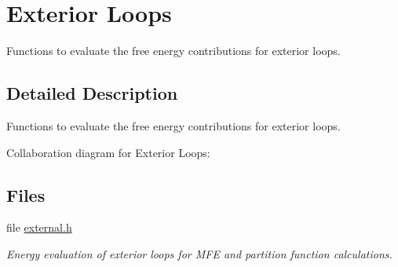 \hypertarget{group__eval__loops__ext}{}\section{Exterior Loops}
\label{group__eval__loops__ext}


Functions to evaluate the free energy contributions for exterior loops.  




\subsection{Detailed Description}
Functions to evaluate the free energy contributions for exterior loops. 

Collaboration diagram for Exterior Loops\+:
\subsection*{Files}
\begin{DoxyCompactItemize}
\item 
file \mbox{\hyperlink{external_8h}{external.\+h}}
\begin{DoxyCompactList}\small\item\em Energy evaluation of exterior loops for M\+FE and partition function calculations. \end{DoxyCompactList}\end{DoxyCompactItemize}
